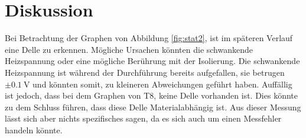 \section{Diskussion}
\label{sec:Diskussion}
Bei Betrachtung der Graphen von Abbildung \ref{fig:stat2}, ist im späteren Verlauf eine Delle zu erkennen. 
Mögliche Ursachen könnten die schwankende Heizspannung oder eine mögliche Berührung mit der Isolierung.
Die schwankende Heizspannung ist während der Durchführung bereits aufgefallen, sie betrugen $\pm \SI{0.1}{\volt}$ und könnten somit, zu kleineren Abweichungen geführt haben.
Auffällig ist jedoch, dass bei dem Graphen von T8, keine Delle vorhanden ist. Dies könnte zu dem Schluss führen, dass diese Delle Materialabhängig ist.
Aus dieser Messung lässt sich aber nichts spezifisches sagen, da es sich auch um einen Messfehler handeln könnte.
